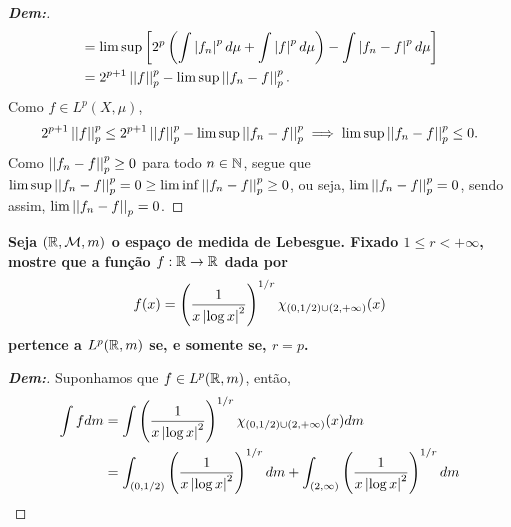 \begin{proof}[\textbf{Dem:}]
\begin{align*}
    &= \lim \sup \cparth{2^p \parth{\int \mparth{f_n}^p d\mu + \int \mparth{f}^p d\mu}
    - \int \mparth{f_n - f}^p d\mu}\\
    &= 2^{p + 1} \pnorm p f^p - \lim\sup \pnorm p {f_n - f}^p. 
  \end{align*}
  Como $f \in L^p(X, \mu)$, 
  \begin{align*}
    2^{p+1}\pnorm p f^p \le 2^{p+1}\pnorm p f^p - \lim \sup \pnorm p {f_n - f}^p \implies
    \lim \sup \pnorm p {f_n - f}^p \le 0.
  \end{align*}
  Como $\pnorm p {f_n - f}^p \ge 0$ para todo $n \in \bN$, segue que 
  $\lim \sup \pnorm p {f_n - f}^p = 0 \ge \lim \inf \pnorm p {f_n - f}^p \ge 0$, 
  ou seja, $\lim \pnorm p {f_n - f}^p = 0$, sendo assim, $\lim \pnorm p {f_n - f} = 0$.
\end{proof}

\textbf{Seja $(\bR, \mcal M, m)$ o espaço de medida de Lebesgue. Fixado $1 \le r < +\infty$, 
mostre que a função $f: \bR \rightarrow \bR$ dada por 
\begin{align*}
  f(x) = \parth{\frac{1}{x\mparth{\log x}^2}}^{1/r} \chi_{(0, 1/2) \cup (2, +\infty)}(x)
\end{align*}
pertence a $L^p(\bR, m)$ se, e somente se, $r=p$.}
\begin{proof}[\textbf{Dem:}]
  Suponhamos que $f \in L^p(\bR, m)$, então, 
  \begin{align*}
    \int f dm &= \int \parth{\frac{1}{x\mparth{\log x}^2}}^{1/r} 
    \chi_{(0, 1/2) \cup (2, +\infty)}(x) dm \\
    &= \int_{(0, 1/2)} \parth{\frac{1}{x\mparth{\log x}^2}}^{1/r}dm
    + \int_{(2, \infty)} \parth{\frac{1}{x\mparth{\log x}^2}}^{1/r} dm
  \end{align*}
\end{proof}

